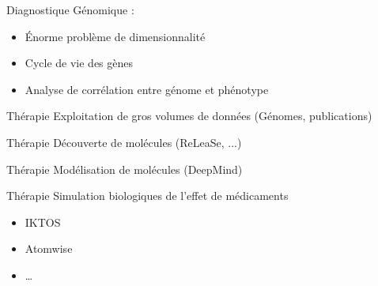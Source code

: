 \begin{frame}{Diagnostique}
  Génomique :
  \newline
  \begin{minipage}[c]{0.49\linewidth}
    \begin{itemize}
    \item Énorme problème de dimensionnalité
    \item Cycle de vie des gènes
    \item Analyse de corrélation entre génome et phénotype
    \end{itemize}
  \end{minipage}\hfill
  \begin{minipage}[c]{0.49\linewidth}
  \end{minipage}\hfill
\end{frame}

\begin{frame}{Thérapie}
  Exploitation de gros volumes de données (Génomes, publications)
  \newline
  \newline
  \begin{minipage}[c]{0.49\linewidth}
  \end{minipage}\hfill
  \begin{minipage}[c]{0.49\linewidth}
  \end{minipage}\hfill
\end{frame}


\begin{frame}{Thérapie}
  Découverte de molécules (ReLeaSe, ...) 
\end{frame}

\begin{frame}{Thérapie}
  Modélisation de molécules (DeepMind)
\end{frame}

\begin{frame}{Thérapie}
  Simulation biologiques de l'effet de médicaments 
  \begin{itemize}
    \item IKTOS
    \item Atomwise
    \item \dots
  \end{itemize}
\end{frame}


